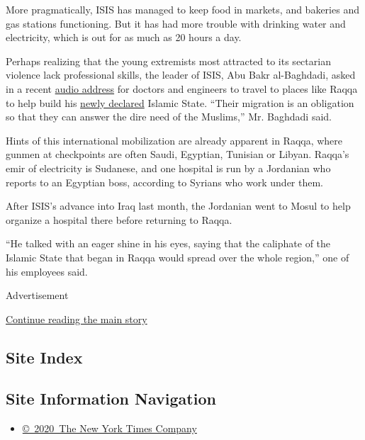 More pragmatically, ISIS has managed to keep food in markets, and
bakeries and gas stations functioning. But it has had more trouble with
drinking water and electricity, which is out for as much as 20 hours a
day.

Perhaps realizing that the young extremists most attracted to its
sectarian violence lack professional skills, the leader of ISIS, Abu
Bakr al-Baghdadi, asked in a recent
\href{https://pietervanostaeyen.wordpress.com/2014/07/01/islamic-state-message-to-the-mujahidin-and-the-islamic-ummah-in-the-month-of-ramadan/}{audio
address} for doctors and engineers to travel to places like Raqqa to
help build his
\href{http://www.nytimes3xbfgragh.onion/2014/07/06/world/asia/iraq-abu-bakr-al-baghdadi-sermon-video.html?_r=0}{newly
declared} Islamic State. ``Their migration is an obligation so that they
can answer the dire need of the Muslims,'' Mr. Baghdadi said.

Hints of this international mobilization are already apparent in Raqqa,
where gunmen at checkpoints are often Saudi, Egyptian, Tunisian or
Libyan. Raqqa's emir of electricity is Sudanese, and one hospital is run
by a Jordanian who reports to an Egyptian boss, according to Syrians who
work under them.

After ISIS's advance into Iraq last month, the Jordanian went to Mosul
to help organize a hospital there before returning to Raqqa.

``He talked with an eager shine in his eyes, saying that the caliphate
of the Islamic State that began in Raqqa would spread over the whole
region,'' one of his employees said.

Advertisement

\protect\hyperlink{after-bottom}{Continue reading the main story}

\hypertarget{site-index}{%
\subsection{Site Index}\label{site-index}}

\hypertarget{site-information-navigation}{%
\subsection{Site Information
Navigation}\label{site-information-navigation}}

\begin{itemize}
\tightlist
\item
  \href{https://help.nytimes3xbfgragh.onion/hc/en-us/articles/115014792127-Copyright-notice}{©~2020~The
  New York Times Company}
\end{itemize}

